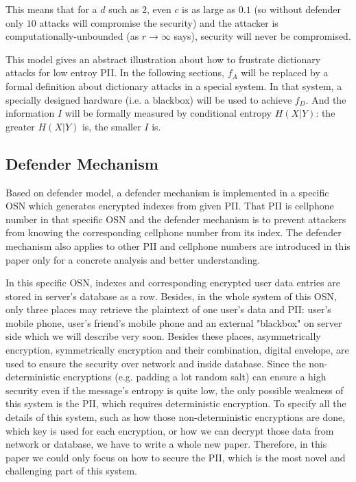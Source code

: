 \documentclass[10pt, conference, compsocconf]{IEEEtran}
\begin{document}
        This means that for a $d$ such as $2$, even $c$ is as large as
        $0.1$ (so without defender only $10$ attacks will compromise
        the security) and the attacker is computationally-unbounded
        (as $r \rightarrow \infty$ says), security will
        never be compromised.

        This model gives an abstract illustration about how to frustrate
        dictionary attacks for low entroy PII.
        In the following sections, $f_A$ will be replaced by a formal definition
        about dictionary attacks in a special system.
        In that system, a specially designed hardware (i.e. a blackbox)
        will be used to achieve $f_D$.
        And the information $I$ will be formally
        measured by conditional entropy $H(X|Y)$: the greater $H(X|Y)$
        is, the smaller $I$ is.

    \subsection{Defender Mechanism}\label{sec_ds}
        Based on defender model, a defender mechanism is implemented
        in a specific OSN
        which generates encrypted indexes
        from given PII. That PII is cellphone number
        in that specific OSN and the defender mechanism is to prevent attackers
        from knowing the corresponding cellphone number from its index.
        The defender mechanism also applies to other PII and cellphone numbers are introduced
        in this paper only for a concrete analysis and better understanding.
        
        In this specific OSN, indexes and corresponding encrypted user data entries are stored
        in server's database as a row. Besides, in the whole system of this OSN, only three places may
        retrieve the plaintext of one user's data and PII: user's mobile phone, user's friend's mobile phone and an external
        "blackbox" on server side which we will describe very soon. 
        Besides these places, asymmetrically encryption, symmetrically encryption
        and their combination, digital envelope, are used to ensure the security over network
        and inside database. Since the non-deterministic encryptions (e.g. padding a lot random salt) 
        can ensure a high security even if the message's entropy is quite low, the only possible weakness
        of this system is the PII, which requires deterministic encryption. To specify all the details of
        this system, such as how those non-deterministic encryptions are done, which key is used for each encryption,
        or how we can decrypt those data from network or database, we have to write a whole new paper. Therefore, 
        in this paper we could only focus on how to secure the PII, 
        which is the most novel and challenging part of this system.
\end{document}
